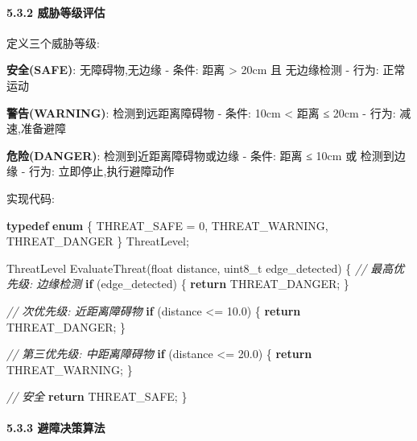 \documentclass[
]{article}
\newenvironment{Shaded}{}{}
\newcommand{\CommentTok}[1]{\textcolor[rgb]{0.38,0.63,0.69}{\textit{#1}}}
\newcommand{\ControlFlowTok}[1]{\textcolor[rgb]{0.00,0.44,0.13}{\textbf{#1}}}
\newcommand{\DataTypeTok}[1]{\textcolor[rgb]{0.56,0.13,0.00}{#1}}
\newcommand{\DecValTok}[1]{\textcolor[rgb]{0.25,0.63,0.44}{#1}}
\newcommand{\FloatTok}[1]{\textcolor[rgb]{0.25,0.63,0.44}{#1}}
\newcommand{\KeywordTok}[1]{\textcolor[rgb]{0.00,0.44,0.13}{\textbf{#1}}}
\newcommand{\NormalTok}[1]{#1}
\begin{document}
\hypertarget{ux5a01ux80c1ux7b49ux7ea7ux8bc4ux4f30}{%
\paragraph{5.3.2
威胁等级评估}\label{ux5a01ux80c1ux7b49ux7ea7ux8bc4ux4f30}}

定义三个威胁等级:

\textbf{安全(SAFE)}: 无障碍物,无边缘 - 条件: 距离 \textgreater{} 20cm 且
无边缘检测 - 行为: 正常运动

\textbf{警告(WARNING)}: 检测到远距离障碍物 - 条件: 10cm \textless{} 距离
≤ 20cm - 行为: 减速,准备避障

\textbf{危险(DANGER)}: 检测到近距离障碍物或边缘 - 条件: 距离 ≤ 10cm 或
检测到边缘 - 行为: 立即停止,执行避障动作

实现代码:

\begin{Shaded}
\begin{Highlighting}[]
\KeywordTok{typedef} \KeywordTok{enum}\NormalTok{ \{}
\NormalTok{    THREAT\_SAFE = }\DecValTok{0}\NormalTok{,}
\NormalTok{    THREAT\_WARNING,}
\NormalTok{    THREAT\_DANGER}
\NormalTok{\} ThreatLevel;}

\NormalTok{ThreatLevel EvaluateThreat(}\DataTypeTok{float}\NormalTok{ distance, }\DataTypeTok{uint8\_t}\NormalTok{ edge\_detected)}
\NormalTok{\{}
    \CommentTok{// 最高优先级: 边缘检测}
    \ControlFlowTok{if}\NormalTok{ (edge\_detected) \{}
        \ControlFlowTok{return}\NormalTok{ THREAT\_DANGER;}
\NormalTok{    \}}
    
    \CommentTok{// 次优先级: 近距离障碍物}
    \ControlFlowTok{if}\NormalTok{ (distance \textless{}= }\FloatTok{10.0}\NormalTok{) \{}
        \ControlFlowTok{return}\NormalTok{ THREAT\_DANGER;}
\NormalTok{    \}}
    
    \CommentTok{// 第三优先级: 中距离障碍物}
    \ControlFlowTok{if}\NormalTok{ (distance \textless{}= }\FloatTok{20.0}\NormalTok{) \{}
        \ControlFlowTok{return}\NormalTok{ THREAT\_WARNING;}
\NormalTok{    \}}
    
    \CommentTok{// 安全}
    \ControlFlowTok{return}\NormalTok{ THREAT\_SAFE;}
\NormalTok{\}}
\end{Highlighting}
\end{Shaded}

\hypertarget{ux907fux969cux51b3ux7b56ux7b97ux6cd5}{%
\paragraph{5.3.3
避障决策算法}\label{ux907fux969cux51b3ux7b56ux7b97ux6cd5}}
\end{document}
